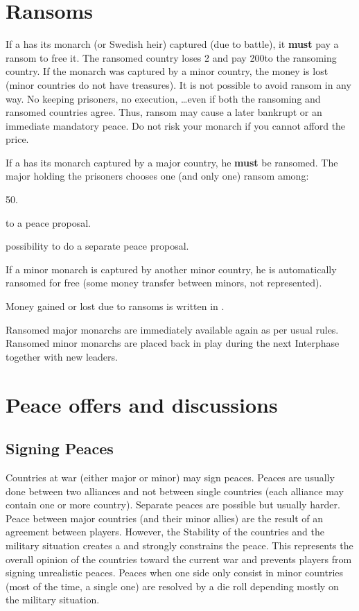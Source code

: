 \section{Ransoms}\label{chPeace:Ransoms}
\aparag[Majors] If a \MAJ has its monarch (or Swedish heir) captured (due to
battle), it \textbf{must} pay a ransom to free it.
\bparag The ransomed country loses 2 \STAB and pay 200\ducats to the ransoming
country.
\bparag If the monarch was captured by a minor country, the money is lost
(minor countries do not have treasures).
\bparag It is not possible to avoid ransom in any way. No keeping prisoners,
no execution, \ldots even if both the ransoming and ransomed countries agree.
\bparag Thus, ransom may cause a later bankrupt or an immediate mandatory
peace. Do not risk your monarch if you cannot afford the price.

\aparag[Minors] If a \MIN has its monarch captured by a major country, he
\textbf{must} be ransomed.
\bparag The major holding the prisoners chooses one (and only one) ransom
among:
\begin{modlist}
\item 50\ducats.
\item {} to a peace proposal.
\item possibility to do a separate peace proposal.
\end{modlist}
\bparag If a minor monarch is captured by another minor country, he is
automatically ransomed for free (some money transfer between minors, not
represented).

\aparag Money gained or lost due to ransoms is written in .

\bparag Ransomed major monarchs are immediately available again as per usual
rules.
\bparag Ransomed minor monarchs are placed back in play during the next
Interphase together with new leaders.

\section{Peace offers and discussions}\label{chPeace:Peace offers}
\subsection{Signing Peaces}
Countries at war (either major or minor) may sign peaces. Peaces are usually
done between two alliances and not between single countries (each alliance may
contain one or more country). Separate peaces are possible but usually
harder. Peace between major countries (and their minor allies) are the result
of an agreement between players. However, the Stability of the countries and
the military situation creates a  and strongly
constrains the peace. This represents the overall opinion of the countries
toward the current war and prevents players from signing unrealistic
peaces. Peaces when one side only consist in minor countries (most of the
time, a single one) are resolved by a die roll depending mostly on the
military situation.

